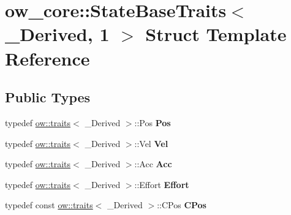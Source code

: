 \hypertarget{structow__core_1_1StateBaseTraits_3_01__Derived_00_011_01_4}{}\section{ow\+\_\+core\+:\+:State\+Base\+Traits$<$ \+\_\+\+Derived, 1 $>$ Struct Template Reference}
\label{structow__core_1_1StateBaseTraits_3_01__Derived_00_011_01_4}
\subsection*{Public Types}
\begin{DoxyCompactItemize}
\item 
typedef \hyperlink{structow_1_1traits}{ow\+::traits}$<$ \+\_\+\+Derived $>$\+::Pos {\bfseries Pos}\hypertarget{structow__core_1_1StateBaseTraits_3_01__Derived_00_011_01_4_a2bf19377e14083ba097fa1e4547d3918}{}\label{structow__core_1_1StateBaseTraits_3_01__Derived_00_011_01_4_a2bf19377e14083ba097fa1e4547d3918}

\item 
typedef \hyperlink{structow_1_1traits}{ow\+::traits}$<$ \+\_\+\+Derived $>$\+::Vel {\bfseries Vel}\hypertarget{structow__core_1_1StateBaseTraits_3_01__Derived_00_011_01_4_ab6174561e6f6640e7410bbd5a480e1f0}{}\label{structow__core_1_1StateBaseTraits_3_01__Derived_00_011_01_4_ab6174561e6f6640e7410bbd5a480e1f0}

\item 
typedef \hyperlink{structow_1_1traits}{ow\+::traits}$<$ \+\_\+\+Derived $>$\+::Acc {\bfseries Acc}\hypertarget{structow__core_1_1StateBaseTraits_3_01__Derived_00_011_01_4_ace2f379052eb7e9282871d4440c69fe5}{}\label{structow__core_1_1StateBaseTraits_3_01__Derived_00_011_01_4_ace2f379052eb7e9282871d4440c69fe5}

\item 
typedef \hyperlink{structow_1_1traits}{ow\+::traits}$<$ \+\_\+\+Derived $>$\+::Effort {\bfseries Effort}\hypertarget{structow__core_1_1StateBaseTraits_3_01__Derived_00_011_01_4_a0a366c3e3b9a68d5ad5471d739f20457}{}\label{structow__core_1_1StateBaseTraits_3_01__Derived_00_011_01_4_a0a366c3e3b9a68d5ad5471d739f20457}

\item 
typedef const \hyperlink{structow_1_1traits}{ow\+::traits}$<$ \+\_\+\+Derived $>$\+::C\+Pos {\bfseries C\+Pos}\hypertarget{structow__core_1_1StateBaseTraits_3_01__Derived_00_011_01_4_abf712b85603d829067a4459ac8ca5890}{}\label{structow__core_1_1StateBaseTraits_3_01__Derived_00_011_01_4_abf712b85603d829067a4459ac8ca5890}


\end{DoxyCompactItemize}
